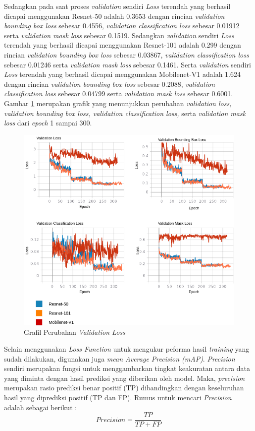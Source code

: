 \documentclass[conference]{IEEEtran}
\begin{document}
	Sedangkan pada saat proses \textit{validation} sendiri \textit{Loss} terendah yang berhasil dicapai menggunakan Resnet-50 adalah 0.3653 dengan rincian \textit{validation bounding box loss} sebesar 0.4556, \textit{validation classification loss} sebesar 0.01912 serta \textit{validation mask loss} sebesar 0.1519. Sedangkan \textit{validation} sendiri \textit{Loss} terendah yang berhasil dicapai menggunakan Resnet-101 adalah 0.299 dengan rincian \textit{validation bounding box loss} sebesar 0.03867, \textit{validation classification loss} sebesar 0.01246 serta \textit{validation mask loss} sebesar 0.1461. Serta \textit{validation} sendiri \textit{Loss} terendah yang berhasil dicapai menggunakan Mobilenet-V1 adalah 1.624 dengan rincian \textit{validation bounding box loss} sebesar 0.2088, \textit{validation classification loss} sebesar 0.04799 serta \textit{validation mask loss} sebesar 0.6001. Gambar \ref{validation-result} merupakan grafik yang menunjukkan perubahan \textit{validation loss, validation bounding box loss, validation classification loss,} serta \textit{validation mask loss} dari \textit{epoch} 1 sampai 300.
	
	\begin{figure}[h]
		\centering
		\includegraphics[scale=0.3]{img/validation.png}
		\caption{Grafil Perubahan \textit{Validation Loss}}
		\label{validation-result}
	\end{figure} 

	Selain menggunakan \textit{Loss Function} untuk mengukur peforma hasil \textit{training} yang sudah dilakukan, digunakan juga \textit{mean Average Precision (mAP)}. \textit{Precision} sendiri merupakan fungsi untuk menggambarkan tingkat keakuratan antara data yang diminta dengan hasil prediksi yang diberikan oleh model. Maka, \textit{precision} merupakan rasio prediksi benar positif (TP) dibandingkan dengan keseluruhan hasil yang diprediksi positif (TP dan FP). Rumus untuk mencari \textit{Precision} adalah sebagai berikut :
	\begin{equation}
		Precision = \frac{TP}{TP+FP} 
	\end{equation}
	
\end{document}
